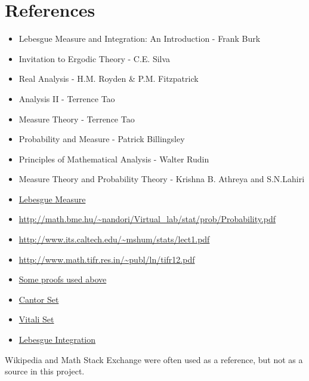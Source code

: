 \documentclass{article}
\begin{document}
\section{References}
\begin{itemize}
    \item Lebesgue Measure and Integration: An Introduction - Frank Burk
    \item Invitation to Ergodic Theory - C.E. Silva
    \item Real Analysis - H.M. Royden \& P.M. Fitzpatrick
    \item Analysis II - Terrence Tao
    \item Measure Theory - Terrence Tao
    \item Probability and Measure - Patrick Billingsley
    \item Principles of Mathematical Analysis - Walter Rudin
    \item Measure Theory and Probability Theory - Krishna B. Athreya and S.N.Lahiri
    \item \href{https://en.wikipedia.org/wiki/Lebesgue_measure}{Lebesgue Measure}
    \item \url{http://math.bme.hu/~nandori/Virtual_lab/stat/prob/Probability.pdf}
    \item \url{http://www.its.caltech.edu/~mshum/stats/lect1.pdf}
    \item \url{http://www.math.tifr.res.in/~publ/ln/tifr12.pdf}
    \item \href{https://faculty.etsu.edu/gardnerr/5210/Beamer-Proofs/Proofs-2-2.pdf}{Some proofs used above}
    \item \href{https://en.wikipedia.org/wiki/Cantor_set}{Cantor Set}
    \item \href{https://en.wikipedia.org/wiki/Vitali_set}{Vitali Set}
    \item \href{https://en.wikipedia.org/wiki/Lebesgue_integration}{Lebesgue Integration}
    
\end{itemize}
Wikipedia and Math Stack Exchange were often used as a reference, but not as a source in this project.
\end{document}
